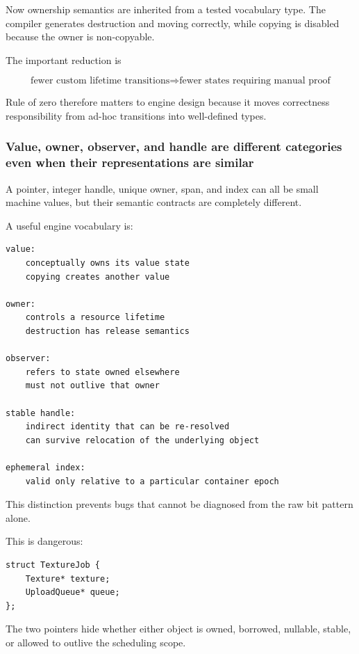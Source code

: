 Now ownership semantics are inherited from a tested vocabulary type. The compiler generates destruction and moving correctly, while copying is disabled because the owner is non-copyable.

The important reduction is

\[
\boxed{
\text{fewer custom lifetime transitions}
\Rightarrow
\text{fewer states requiring manual proof}
}
\]

Rule of zero therefore matters to engine design because it moves correctness responsibility from ad-hoc transitions into well-defined types.

\subsubsection{Value, owner, observer, and handle are different categories even when their representations are similar}\label{01-foundations-i-ch005-value-owner-observer-and-handle-are-different-categories-even-when-their-representations-are-similar}

A pointer, integer handle, unique owner, span, and index can all be small machine values, but their semantic contracts are completely different.

A useful engine vocabulary is:

\begin{verbatim}
value:
    conceptually owns its value state
    copying creates another value

owner:
    controls a resource lifetime
    destruction has release semantics

observer:
    refers to state owned elsewhere
    must not outlive that owner

stable handle:
    indirect identity that can be re-resolved
    can survive relocation of the underlying object

ephemeral index:
    valid only relative to a particular container epoch
\end{verbatim}

This distinction prevents bugs that cannot be diagnosed from the raw bit pattern alone.

This is dangerous:

\begin{verbatim}
struct TextureJob {
    Texture* texture;
    UploadQueue* queue;
};
\end{verbatim}

The two pointers hide whether either object is owned, borrowed, nullable, stable, or allowed to outlive the scheduling scope.

